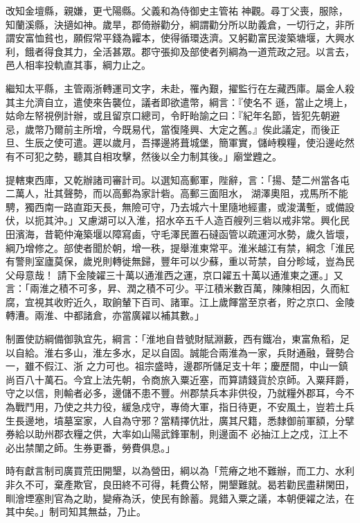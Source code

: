 \begin{pinyinscope}
 改知金壇縣，親嫌，更弋陽縣。父義和為侍御史主管祐
 神觀。尋丁父喪，服除，知蘭溪縣，決擿如神。歲旱，郡倚辦勸分，綱謂勸分所以助義倉，一切行之，非所謂安富恤貧也，願假常平錢為糶本，使得循環迭濟。又躬勸富民浚築塘堰，大興水利，餓者得食其力，全活甚眾。郡守張抑及部使者列綱為一道荒政之冠。以言去，邑人相率投軌直其事，綱力止之。



 繼知太平縣，主管兩浙轉運司文字，未赴，罹內艱，擢監行在左藏西庫。屬金人殺其主允濟自立，遣使來告襲位，議者即欲遣幣，綱言：『使名不
 遜，當止之境上，姑命左帑視例計辦，或且留京口總司，令盱眙諭之曰：『紀年名節，皆犯先朝避忌，歲幣乃爾前主所增，今既易代，當復隆興、大定之舊。』俟此議定，而後正旦、生辰之使可遣。遲以歲月，吾擇邊將葺城堡，簡軍實，儲峙糗糧，使沿邊屹然有不可犯之勢，聽其自相攻擊，然後以全力制其後。」廟堂韙之。



 提轄東西庫，又乾辦諸司審計司。以選知高郵軍，陛辭，言：「揚、楚二州當各屯二萬人，壯其聲勢，而以高郵為家計砦。高郵三面阻水，
 湖澤奧阻，戎馬所不能騁，獨西南一路直距天長，無險可守，乃去城六十里隨地經畫，或浚溝塹，或備設伏，以扼其沖。」又慮湖可以入淮，招水卒五千人造百艘列三砦以戒非常。興化民田濱海，昔範仲淹築堰以障寫鹵，守毛澤民置石䃮函管以疏運河水勢，歲久皆壞，綱乃增修之。部使者聞於朝，增一秩，提舉淮東常平。淮米越江有禁，綱念「淮民有警則室廬莫保，歲兇則轉徙無歸，豐年可以少蘇，重以苛禁，自分畛域，豈為民父母意哉！
 請下金陵糴三十萬以通淮西之運，京口糴五十萬以通淮東之運。」又言：「兩淮之積不可多，昇、潤之積不可少。平江積米數百萬，陳陳相因，久而紅腐，宜視其收貯近久，取餉輦下百司、諸軍。江上歲餫當至京者，貯之京口、金陵轉漕。兩淮、中都諸倉，亦當廣糴以補其數。」



 制置使訪綱備御孰宜先，綱言：「淮地自昔號財賦淵藪，西有鐵冶，東富魚稻，足以自給。淮右多山，淮左多水，足以自固。誠能合兩淮為一家，兵財通融，聲勢合一，雖不假江、浙
 之力可也。祖宗盛時，邊郡所儲足支十年；慶歷間，中山一鎮尚百八十萬石。今宜上法先朝，令商旅入粟近塞，而算請錢貨於京師。入粟拜爵，守之以信，則輸者必多，邊儲不患不豐。州郡禁兵本非供役，乃就糧外郡耳，今不為戰鬥用，乃使之共力役，緩急戍守，專倚大軍，指日待更，不安風土，豈若土兵生長邊地，墳墓室家，人自為守邪？當精擇伉壯，廣其尺籍，悉隸御前軍額，分擘券給以助州郡衣糧之供，大率如山陽武鋒軍制，則邊面不
 必抽江上之戍，江上不必出禁闈之師。生券更番，勞費俱息。」



 時有獻言制司廣買荒田開墾，以為營田，綱以為「荒瘠之地不難辦，而工力、水利非久不可，棄產欺官，良田終不可得，耗費公帑，開墾難就。曷若勸民盡耕閑田，甽澮堙塞則官為之助，變瘠為沃，使民有餘蓄。晁錯入粟之議，本朝便糴之法，在其中矣。」制司知其無益，乃止。




\end{pinyinscope}
